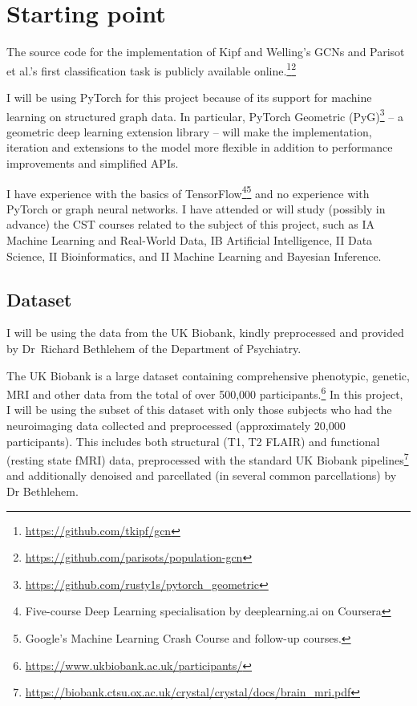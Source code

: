 \section*{Starting point}

The source code for the implementation of Kipf and Welling's \cite{kipf2017semi} GCNs and Parisot et al.'s \cite{parisot2017spectral, parisot2018disease} first classification task is publicly available online.\footnote{\url{https://github.com/tkipf/gcn}}\footnote{\url{https://github.com/parisots/population-gcn}}

I will be using PyTorch for this project because of its support for machine learning on structured graph data. In particular, PyTorch Geometric (PyG)\footnote{\url{https://github.com/rusty1s/pytorch_geometric}} – a geometric deep learning extension library – will make the implementation, iteration and extensions to the model more flexible in addition to performance improvements and simplified APIs.

I have experience with the basics of TensorFlow\footnote{Five-course Deep Learning specialisation by deeplearning.ai on Coursera}\footnote{Google's Machine Learning Crash Course and follow-up courses.} and no experience with PyTorch or graph neural networks. I have attended or will study (possibly in advance) the CST courses related to the subject of this project, such as IA Machine Learning and Real-World Data, IB Artificial Intelligence, II Data Science, II Bioinformatics, and II Machine Learning and Bayesian Inference.

\subsection*{Dataset}

I will be using the data from the UK Biobank, kindly preprocessed and provided by Dr~Richard Bethlehem of the Department of Psychiatry.

The UK Biobank is a large dataset containing comprehensive phenotypic, genetic, MRI and other data from the total of over 500,000 participants.\footnote{\url{https://www.ukbiobank.ac.uk/participants/}} In this project, I will be using the subset of this dataset with only those subjects who had the neuroimaging data collected and preprocessed (approximately 20,000 participants). This includes both structural (T1, T2 FLAIR) and functional (resting state fMRI) data, preprocessed with the standard UK Biobank pipelines\footnote{\url{https://biobank.ctsu.ox.ac.uk/crystal/crystal/docs/brain_mri.pdf}} and additionally denoised and parcellated (in several common parcellations) by Dr Bethlehem. 

